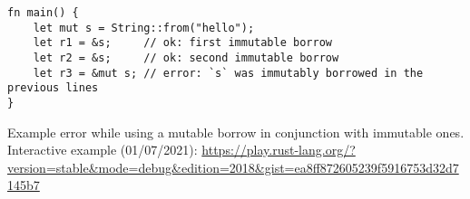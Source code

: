 \begin{listing}
    \begin{verbatim}
fn main() {
    let mut s = String::from("hello");
    let r1 = &s;     // ok: first immutable borrow
    let r2 = &s;     // ok: second immutable borrow
    let r3 = &mut s; // error: `s` was immutably borrowed in the previous lines
}
    \end{verbatim}
    \caption{Example error while using a mutable borrow in conjunction with immutable ones. Interactive example (01/07/2021): \url{https://play.rust-lang.org/?version=stable&mode=debug&edition=2018&gist=ea8ff872605239f5916753d32d7145b7}}
    \label{lst:rust-borrow-n-immut-1-mut}
\end{listing}